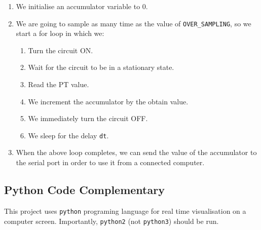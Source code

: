 \documentclass[]{article}
\begin{document}
\begin{enumerate}
\def\labelenumi{\arabic{enumi}.}
\itemsep1pt\parskip0pt
\item
  We initialise an accumulator variable to 0.
\item
  We are going to sample as many time as the value of
  \texttt{OVER\_SAMPLING}, so we start a for loop in which we:

  \begin{enumerate}
  \def\labelenumii{\arabic{enumii}.}
  \itemsep1pt\parskip0pt
  \item
    Turn the circuit ON.
  \item
    Wait for the circuit to be in a stationary state.
  \item
    Read the PT value.
  \item
    We increment the accumulator by the obtain value.
  \item
    We immediately turn the circuit OFF.
  \item
    We sleep for the delay \texttt{dt}.
  \end{enumerate}
\item
  When the above loop completes, we can send the value of the
  accumulator to the serial port in order to use it from a connected
  computer.
\end{enumerate}

\subsection{Python Code Complementary}\label{python-code-complementary}

This project uses \texttt{python} programing language for real time
visualisation on a computer screen. Importantly, \texttt{python2} (not
\texttt{python3}) should be run.
\end{document}
